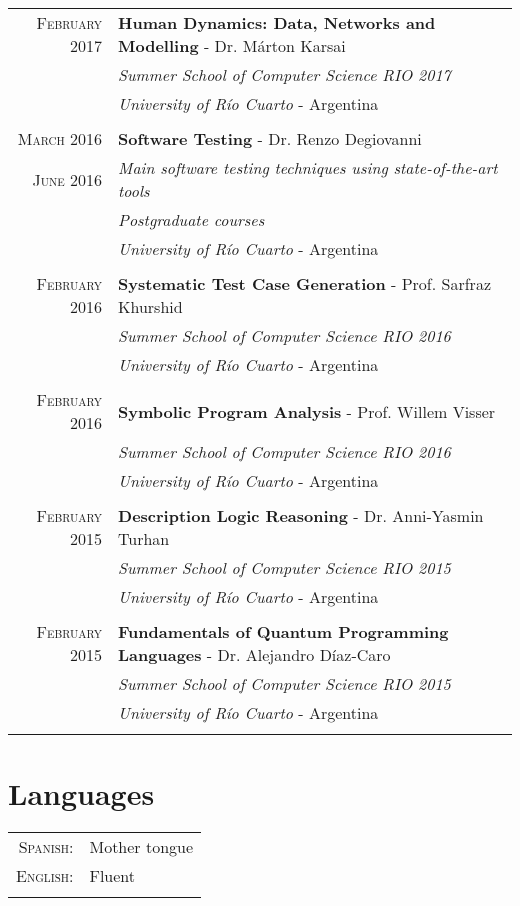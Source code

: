 \documentclass[a4paper,10pt]{article} %
\begin{document}
\begin{longtable}{rl}
\textsc{February} 2017 & \textbf{Human Dynamics: Data, Networks and Modelling} - Dr. Márton Karsai \\
& \textit{Summer School of Computer Science RIO 2017} \\
& \textit{University of Río Cuarto} - Argentina \\ & \\

\textsc{March} 2016 & \textbf{Software Testing} - Dr. Renzo Degiovanni \\
\textsc{June} 2016 & \textit{Main software testing techniques using state-of-the-art tools} \\
& \textit{Postgraduate courses} \\
& \textit{University of Río Cuarto} - Argentina \\ & \\

\textsc{February} 2016 & \textbf{Systematic Test Case Generation} - Prof. Sarfraz Khurshid \\
& \textit{Summer School of Computer Science RIO 2016} \\
& \textit{University of Río Cuarto} - Argentina \\ & \\

\textsc{February} 2016 & \textbf{Symbolic Program Analysis} - Prof. Willem Visser \\
& \textit{Summer School of Computer Science RIO 2016} \\
& \textit{University of Río Cuarto} - Argentina \\ & \\

\textsc{February} 2015 & \textbf{Description Logic Reasoning} - Dr. Anni-Yasmin Turhan\\
& \textit{Summer School of Computer Science RIO 2015} \\
& \textit{University of Río Cuarto} - Argentina \\ & \\

\textsc{February} 2015 & \textbf{Fundamentals of Quantum Programming Languages} - Dr. Alejandro Díaz-Caro \\
& \textit{Summer School of Computer Science RIO 2015} \\
& \textit{University of Río Cuarto} - Argentina \\ & \\

\end{longtable}

\section{Languages}
\begin{tabular}{rl}
\\
\textsc{Spanish:} & Mother tongue\\
\textsc{English:} & Fluent \\ & \\
\end{tabular}
\end{document}
